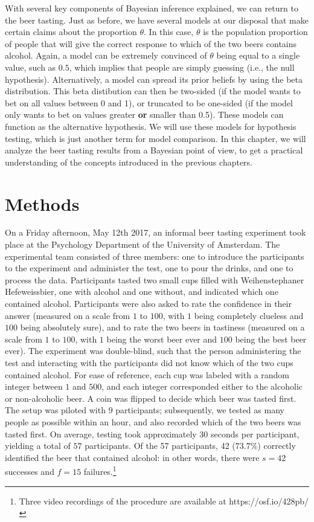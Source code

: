 \documentclass[
  letterpaper,
  DIV=11,
  numbers=noendperiod]{scrreprt}
\begin{document}
With several key components of Bayesian inference explained, we can
return to the beer tasting. Just as before, we have several models at
our disposal that make certain claims about the proportion \(\theta\).
In this case, \(\theta\) is the population proportion of people that
will give the correct response to which of the two beers contains
alcohol. Again, a model can be extremely convinced of \(\theta\) being
equal to a single value, such as \(0.5\), which implies that people are
simply guessing (i.e., the null hypothesis). Alternatively, a model can
spread its prior beliefs by using the beta distribution. This beta
distibution can then be two-sided (if the model wants to bet on all
values between 0 and 1), or truncated to be one-sided (if the model only
wants to bet on values greater \textbf{or} smaller than 0.5). These
models can function as the alternative hypothesis. We will use these
models for hypothesis testing, which is just another term for model
comparison. In this chapter, we will analyze the beer tasting results
from a Bayesian point of view, to get a practical understanding of the
concepts introduced in the previous chapters.

\hypertarget{methods}{%
\section{Methods}\label{methods}}

On a Friday afternoon, May 12th 2017, an informal beer tasting
experiment took place at the Psychology Department of the University of
Amsterdam. The experimental team consisted of three members: one to
introduce the participants to the experiment and administer the test,
one to pour the drinks, and one to process the data. Participants tasted
two small cups filled with Weihenstephaner Hefeweissbier, one with
alcohol and one without, and indicated which one contained alcohol.
Participants were also asked to rate the confidence in their answer
(measured on a scale from \(1\) to \(100\), with \(1\) being completely
clueless and \(100\) being absolutely sure), and to rate the two beers
in tastiness (measured on a scale from \(1\) to \(100\), with \(1\)
being the worst beer ever and \(100\) being the best beer ever). The
experiment was double-blind, such that the person administering the test
and interacting with the participants did not know which of the two cups
contained alcohol. For ease of reference, each cup was labeled with a
random integer between \(1\) and \(500\), and each integer corresponded
either to the alcoholic or non-alcoholic beer. A coin was flipped to
decide which beer was tasted first. The setup was piloted with \(9\)
participants; subsequently, we tested as many people as possible within
an hour, and also recorded which of the two beers was tasted first. On
average, testing took approximately 30 seconds per participant, yielding
a total of \(57\) participants. Of the 57 participants, 42 (\(73.7\%\))
correctly identified the beer that contained alcohol: in other words,
there were \(s = 42\) successes and \(f = 15\) failures.\footnote{Three
  video recordings of the procedure are available at
  https://osf.io/428pb/}
\end{document}
